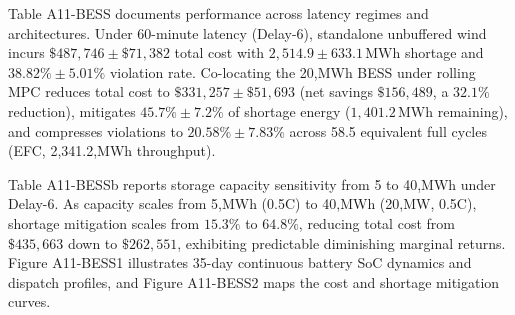 \documentclass[
  journal]{IEEEtran}
\begin{document}
Table A11-BESS documents performance across latency regimes and
architectures. Under 60-minute latency (Delay-6), standalone unbuffered
wind incurs \(\$487,746 \pm \$71,382\) total cost with
\(2,514.9 \pm 633.1\,\text{MWh}\) shortage and \(38.82\% \pm 5.01\%\)
violation rate. Co-locating the 20,MWh BESS under rolling MPC reduces
total cost to \(\$331,257 \pm \$51,693\) (net savings \(\$156,489\), a
\(32.1\%\) reduction), mitigates \(45.7\% \pm 7.2\%\) of shortage energy
(\(1,401.2\,\text{MWh}\) remaining), and compresses violations to
\(20.58\% \pm 7.83\%\) across 58.5 equivalent full cycles (EFC,
2,341.2,MWh throughput).

Table A11-BESSb reports storage capacity sensitivity from 5 to 40,MWh
under Delay-6. As capacity scales from 5,MWh (0.5C) to 40,MWh (20,MW,
0.5C), shortage mitigation scales from \(15.3\%\) to \(64.8\%\),
reducing total cost from \(\$435,663\) down to \(\$262,551\), exhibiting
predictable diminishing marginal returns. Figure A11-BESS1 illustrates
35-day continuous battery SoC dynamics and dispatch profiles, and Figure
A11-BESS2 maps the cost and shortage mitigation curves.
\end{document}
